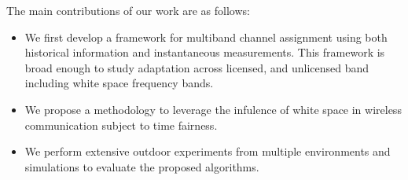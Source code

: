 The main contributions of our work are as follows:
\begin{itemize}
\item We first develop a framework for multiband channel assignment using both historical information and instantaneous measurements. This framework is broad enough to study adaptation across licensed, and unlicensed band including white space frequency bands.  

\item We propose a methodology to leverage the infulence of white space in wireless communication subject to time fairness.

\item We perform extensive outdoor experiments from multiple environments and simulations to evaluate the proposed algorithms.


\end{itemize}




